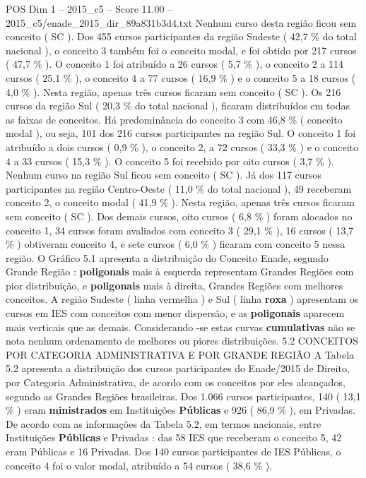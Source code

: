 \begin{textsample}{POS Dim 1 – 2015\_c5 – Score 11.00 – 2015\_c5/enade\_2015\_dir\_89a831b3d4.txt}
Nenhum curso desta região ficou sem conceito ( SC ).
Dos 455 cursos participantes da região Sudeste ( 42,7 \% do total nacional ), o conceito 3 também foi o conceito modal, e foi obtido por 217 cursos ( 47,7 \% ).
O conceito 1 foi atribuído a 26 cursos ( 5,7 \% ), o conceito 2 a 114 cursos ( 25,1 \% ), o conceito 4 a 77 cursos ( 16,9 \% ) e o conceito 5 a 18 cursos ( 4,0 \% ).
Nesta região, apenas três cursos ficaram sem conceito ( SC ).
Os 216 cursos da região Sul ( 20,3 \% do total nacional ), ficaram distribuídos em todas as faixas de conceitos.
Há predominância do conceito 3 com 46,8 \% ( conceito modal ), ou seja, 101 dos 216 cursos participantes na região Sul.
O conceito 1 foi atribuído a dois cursos ( 0,9 \% ), o conceito 2, a 72 cursos ( 33,3 \% ) e o conceito 4 a 33 cursos ( 15,3 \% ).
O conceito 5 foi recebido por oito cursos ( 3,7 \% ).
Nenhum curso na região Sul ficou sem conceito ( SC ).
Já dos 117 cursos participantes na região Centro-Oeste ( 11,0 \% do total nacional ), 49 receberam conceito 2, o conceito modal ( 41,9 \% ).
Nesta região, apenas três cursos ficaram sem conceito ( SC ).
Dos demais cursos, oito cursos ( 6,8 \% ) foram alocados no conceito 1, 34 cursos foram avaliados com conceito 3 ( 29,1 \% ), 16 cursos ( 13,7 \% ) obtiveram conceito 4, e sete cursos ( 6,0 \% ) ficaram com conceito 5 nessa região.
O Gráfico 5.1 apresenta a distribuição do Conceito Enade, segundo Grande Região : \textbf{poligonais} mais à esquerda representam Grandes Regiões com pior distribuição, e \textbf{poligonais} mais à direita, Grandes Regiões com melhores conceitos.
A região Sudeste ( linha vermelha ) e Sul ( linha \textbf{roxa} ) apresentam os cursos em IES com conceitos com menor dispersão, e as \textbf{poligonais} aparecem mais verticais que as demais.
Considerando -se estas curvas \textbf{cumulativas} não se nota nenhum ordenamento de melhores ou piores distribuições. 5.2 CONCEITOS POR CATEGORIA ADMINISTRATIVA E POR GRANDE REGIÃO A Tabela 5.2 apresenta a distribuição dos cursos participantes do Enade/2015 de Direito, por Categoria Administrativa, de acordo com os conceitos por eles alcançados, segundo as Grandes Regiões brasileiras.
Dos 1.066 cursos participantes, 140 ( 13,1 \% ) eram \textbf{ministrados} em Instituições \textbf{Públicas} e 926 ( 86,9 \% ), em Privadas.
De acordo com as informações da Tabela 5.2, em termos nacionais, entre Instituições \textbf{Públicas} e Privadas : das 58 IES que receberam o conceito 5, 42 eram Públicas e 16 Privadas.
Dos 140 cursos participantes de IES Públicas, o conceito 4 foi o valor modal, atribuído a 54 cursos ( 38,6 \% ).

\end{textsample}
